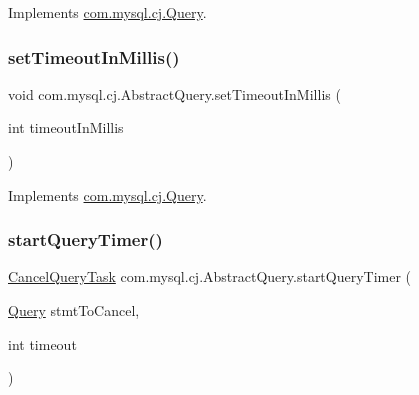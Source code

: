 Implements \mbox{\hyperlink{interfacecom_1_1mysql_1_1cj_1_1_query_abb2b03623cac9e35394b4ed22008f683}{com.\+mysql.\+cj.\+Query}}.

\mbox{\label{classcom_1_1mysql_1_1cj_1_1_abstract_query_adcf9dfa4142b1922dc2fd8e09d70795a}} 
\subsubsection{\texorpdfstring{set\+Timeout\+In\+Millis()}{setTimeoutInMillis()}}
{\footnotesize\ttfamily void com.\+mysql.\+cj.\+Abstract\+Query.\+set\+Timeout\+In\+Millis (\begin{DoxyParamCaption}\item[{int}]{timeout\+In\+Millis }\end{DoxyParamCaption})}



Implements \mbox{\hyperlink{interfacecom_1_1mysql_1_1cj_1_1_query_a9bdb29806cdcfabc9bf48c9c7872d777}{com.\+mysql.\+cj.\+Query}}.

\mbox{\label{classcom_1_1mysql_1_1cj_1_1_abstract_query_af15cecea61e92e9c1e6e6d01990cf568}} 
\subsubsection{\texorpdfstring{start\+Query\+Timer()}{startQueryTimer()}}
{\footnotesize\ttfamily \mbox{\hyperlink{interfacecom_1_1mysql_1_1cj_1_1_cancel_query_task}{Cancel\+Query\+Task}} com.\+mysql.\+cj.\+Abstract\+Query.\+start\+Query\+Timer (\begin{DoxyParamCaption}\item[{\mbox{\hyperlink{interfacecom_1_1mysql_1_1cj_1_1_query}{Query}}}]{stmt\+To\+Cancel,  }\item[{int}]{timeout }\end{DoxyParamCaption})}



